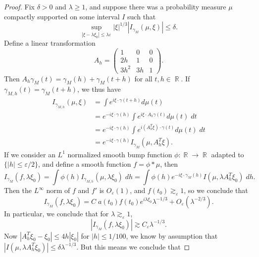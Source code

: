 \documentclass[dvipsnames,letterpaper,12pt]{article}
\DeclareMathOperator{\RR}{\mathbb{R}}
\begin{document}
\begin{proof}
    Fix $\delta > 0$ and $\lambda \geq 1$, and suppose there was a probability measure $\mu$ compactly supported on some interval $I$ such that
    \[ \sup_{|\xi - \lambda \xi_0| \leq \lambda \varepsilon} |\xi|^{1/3} |I_{\gamma_M}(\mu,\xi)| \leq \delta. \]
    Define a linear transformation
    \[ A_h = \begin{pmatrix} 1 & 0 & 0 \\ 2h & 1 & 0 \\ 3h^2 & 3h & 1 \end{pmatrix}. \]
    Then $A_h \gamma_M(t) = \gamma_M(h) + \gamma_M(t + h)$ for all $t,h \in \RR$. If $\gamma_{M,h}(t) = \gamma_M(t + h)$, we thus have
    \begin{align*}
        I_{\gamma_{M,h}}(\mu,\xi) &= \int e^{i \xi \cdot \gamma(t + h)} d\mu(t)\\
        &= e^{-i \xi \cdot \gamma(h)} \int e^{i \xi \cdot A_h \gamma(t)} d\mu(t)\; dt\\
        &= e^{-i \xi \cdot \gamma(h)} \int e^{i (A_h^T \xi) \cdot \gamma(t)} d\mu(t)\; dt\\
        &= e^{-i \xi \cdot \gamma(h)} I_{\gamma_M}(\mu,A_h^T \xi).
    \end{align*}
    If we consider an $L^1$ normalized smooth bump function $\phi: \RR \to \RR$ adapted to $\{ |h| \leq \varepsilon/2 \}$, and define a smooth function $f = \phi * \mu$, then
    \[ I_{\gamma_M}(f, \lambda \xi_0) = \int \phi(h) I_{\gamma_{M,h}}(\mu, \lambda \xi_0)\; dh = \int \phi(h) e^{-i \xi \cdot \gamma_M(h)} I(\mu, \lambda A_h^T \xi_0)\; dh. \]
    Then the $L^\infty$ norm of $f$ and $f'$ is $O_\varepsilon(1)$, and $f(t_0) \gtrsim_\varepsilon 1$, so we conclude that
%
    \[ I_{\gamma_M}(f, \lambda \xi_0) = C\; a(t_0) f(t_0) e^{i \lambda \xi_0} \lambda^{-1/3} + O_\varepsilon( \lambda^{-2/3}). \]
    In particular, we conclude that for $\lambda \gtrsim_\varepsilon 1$,
    \[ |I_{\gamma_M}(f,\lambda \xi_0)| \gtrsim C_\varepsilon \lambda^{-1/3}. \]
    Now $|A_h^T \xi_0 - \xi_0| \leq 4 h |\xi_0|$ for $|h| \leq 1 / 100$, we know by assumption that $|I(\mu, \lambda A_h^T \xi_0)| \leq \delta \lambda^{-1/3}$. But this means we conclude that

\end{proof}
\end{document}
